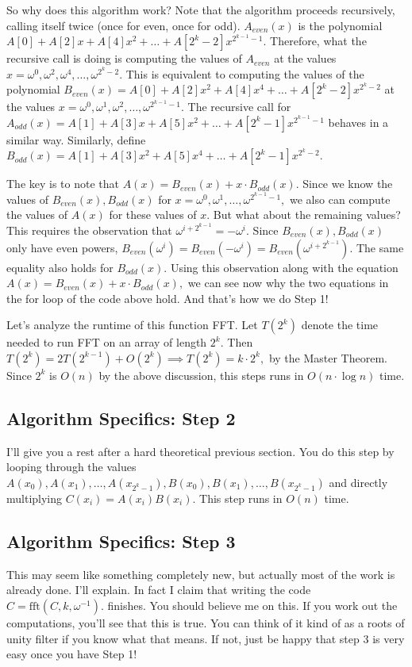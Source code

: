 So why does this algorithm work? Note that the algorithm proceeds recursively, calling itself twice (once for even, once for odd). $A_{even}(x)$ is the polynomial $A[0] + A[2]x + A[4]x^2 + \dots + A[2^k-2]x^{2^{k-1}-1}.$ Therefore, what the recursive call is doing is computing the values of $A_{even}$ at the values $x = \omega^0, \omega^2, \omega^4, \dots, \omega^{2^k-2}.$ This is equivalent to computing the values of the polynomial $B_{even}(x) = A[0] + A[2]x^2 + A[4]x^4 + \dots + A[2^k-2]x^{2^{k}-2}$ at the values $x = \omega^0, \omega^1, \omega^2, \dots, \omega^{2^{k-1}-1}.$ The recursive call for $A_{odd}(x) = A[1] + A[3]x + A[5]x^2 + \dots + A[2^k-1]x^{2^{k-1}-1}$ behaves in a similar way. Similarly, define $B_{odd}(x) = A[1] + A[3]x^2 + A[5]x^4 + \dots + A[2^k-1]x^{2^{k}-2}.$

The key is to note that $A(x) = B_{even}(x) + x \cdot B_{odd}(x).$ Since we know the values of $B_{even}(x), B_{odd}(x)$ for $x = \omega^0, \omega^1, \dots, \omega^{2^{k-1}-1},$ we also can compute the values of $A(x)$ for these values of $x$. But what about the remaining values? This requires the observation that $\omega^{i + 2^{k-1}} = -\omega^i.$ Since $B_{even}(x), B_{odd}(x)$ only have even powers, $B_{even}(\omega^i) = B_{even}(-\omega^i) = B_{even}(\omega^{i + 2^{k-1}}).$ The same equality also holds for $B_{odd}(x).$ Using this observation along with the equation $A(x) = B_{even}(x) + x \cdot B_{odd}(x),$ we can see now why the two equations in the for loop of the code above hold. And that's how we do Step 1!

Let's analyze the runtime of this function FFT. Let $T(2^k)$ denote the time needed to run FFT on an array of length $2^k.$ Then $T(2^k) = 2T(2^{k-1}) + O(2^k) \implies T(2^k) = k \cdot 2^k,$ by the Master Theorem. Since $2^k$ is $O(n)$ by the above discussion, this steps runs in $O(n \cdot \log n)$ time.

\subsection{Algorithm Specifics: Step 2}

I'll give you a rest after a hard theoretical previous section. You do this step by looping through the values $A(x_0), A(x_1), \dots, A(x_{2^k-1}), B(x_0), B(x_1), \dots, B(x_{2^k-1})$ and directly multiplying $C(x_i) = A(x_i)B(x_i).$ This step runs in $O(n)$ time.

\subsection{Algorithm Specifics: Step 3}

This may seem like something completely new, but actually most of the work is already done. I'll explain. In fact I claim that writing the code $C = \text{fft}(C, k, \omega^{-1}).$ finishes. You should believe me on this. If you work out the computations, you'll see that this is true. You can think of it kind of as a roots of unity filter if you know what that means. If not, just be happy that step 3 is very easy once you have Step 1!
